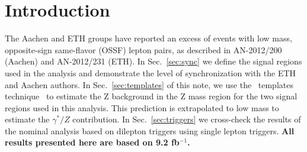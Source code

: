 \section{Introduction}
\label{ref:intro}

The Aachen and ETH groups have reported an excess of events with low mass, opposite-sign same-flavor (OSSF) lepton pairs,
as described in AN-2012/200 (Aachen) and AN-2012/231 (ETH). In Sec.~\ref{sec:sync} we define the signal regions used
in the analysis and demonstrate the level of synchronization with the ETH and Aachen authors.
In Sec.~\ref{sec:templates} of this note, we use the \MET\ templates 
technique~\cite{ref:Zpaper} to estimate the Z background in the Z mass region for the two signal regions used in this analysis. 
This prediction is extrapolated to low mass to estimate the $\gamma^*/Z$ contribution. In Sec.~\ref{sec:triggers} we cross-check 
the results of the nominal analysis based on dilepton triggers using single lepton triggers.
{\bf All results presented here are based on 9.2 fb$^{-1}$.}
